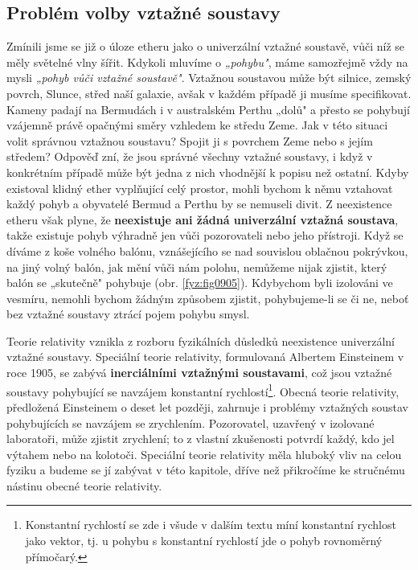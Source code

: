    \subsection{Problém volby vztažné soustavy}
      Zmínili jsme se již o úloze etheru jako o univerzální vztažné soustavě, vůči níž se měly
      světelné vlny šířit. Kdykoli mluvíme o \emph{„pohybu"}, máme samozřejmě vždy na mysli
      \emph{„pohyb vůči vztažné soustavě"}. Vztažnou soustavou může být silnice, zemský povrch,
      Slunce, střed naší galaxie, avšak v každém případě ji musíme specifikovat. Kameny padají na
      Bermudách i v australském Perthu „dolů" a přesto se pohybují vzájemně právě opačnými směry
      vzhledem ke středu Zeme. Jak v této situaci volit správnou vztažnou soustavu? Spojit ji s
      povrchem Zeme nebo s jejím středem? Odpověď zní, že jsou správné všechny vztažné soustavy, i
      když v konkrétním případě může být jedna z nich vhodnější k popisu než ostatní. Kdyby
      existoval klidný ether vyplňující celý prostor, mohli bychom k němu vztahovat každý pohyb a
      obyvatelé Bermud a Perthu by se nemuseli divit. Z neexistence etheru však plyne, že
      \textbf{neexistuje ani žádná univerzální vztažná soustava}, takže existuje pohyb výhradně jen
      vůči pozorovateli nebo jeho přístroji. Když se díváme z koše volného balónu, vznášejí­cího se
      nad souvislou oblačnou pokrývkou, na jiný volný balón, jak mění vůči nám polohu, nemůžeme
      nijak zjistit, který balón se „skutečně" pohybuje (obr. \ref{fyz:fig0905}). Kdybychom byli
      izolováni ve vesmíru, nemohli bychom žádným způsobem zjistit, pohybujeme-li se či ne, neboť
      bez vztažné soustavy ztrácí pojem pohybu smysl.


      Teorie relativity vznikla z rozboru fyzikálních důsledků neexistence univerzální vztažné
      soustavy. Speciální teorie relativity, formulovaná Albertem Einsteinem v roce 1905, se zabývá
      \textbf{inerciálními vztažnými soustavami}, což jsou vztažné soustavy pohybující se navzájem
      konstantní rychlostí\footnote{Konstantní rychlostí se zde i všude v dalším textu míní
      konstantní rychlost jako vektor, tj. u pohybu s konstantní rychlostí jde o pohyb rovnoměrný
      přímočarý.}. Obecná teorie relativity, předložená Einsteinem o deset let později, zahrnuje i
      problémy vztažných soustav pohybujících se navzájem se zrychlením. Pozorovatel, uzavřený v
      izolované laboratoři, může zjistit zrychlení; to z vlastní zkušenosti potvrdí každý, kdo jel
      výtahem nebo na kolotoči. Speciální teorie relativity měla hluboký vliv na celou fyziku a
      budeme se jí zabývat v této kapitole, dříve než přikročíme ke stručnému nástinu obecné teorie
      relativity.

